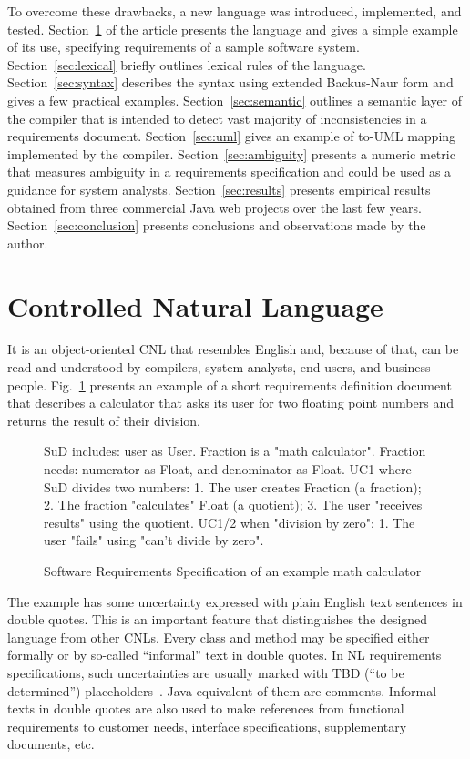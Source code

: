 \documentclass[conference]{IEEEtran}
\newcommand{\code}[1]{\adjustbox{padding=3pt 1pt 3pt 1pt, cframe=gray!50, bgcolor=gray!10}{\texttt{#1}}}
\newcommand{\nospell}[1]{#1}
\begin{document}
To overcome these drawbacks, a new language was introduced,
implemented, and tested. Section~\ref{sec:Requs} of
the article presents the language and gives a simple example of its use,
specifying requirements of a sample software system.
Section~\ref{sec:lexical} briefly outlines lexical rules of the language.
Section~\ref{sec:syntax} describes the syntax using extended \nospell{Backus-Naur}
form and gives a few practical examples. Section~\ref{sec:semantic} outlines
a semantic layer of the compiler that is intended to detect vast majority
of inconsistencies in a requirements document.
Section~\ref{sec:uml} gives an example of to-UML mapping implemented
by the compiler. Section~\ref{sec:ambiguity}
presents a numeric metric that measures ambiguity in a requirements
specification and could be used as a guidance for system analysts.
Section~\ref{sec:results} presents empirical results obtained from three
commercial Java web projects over the last few years.
Section~\ref{sec:conclusion} presents conclusions and observations made by
the author.

\section{Controlled Natural Language}
\label{sec:Requs}

It is an object-oriented CNL that resembles English and, because of that,
can be read and understood by compilers, system analysts, end-users, and
business people. Fig.~\ref{fig:example} presents an example of a short
requirements definition document that describes a calculator that asks its
user for two floating point numbers and returns the result of their
division.

\begin{figure}
\begin{textcode}
SuD includes: user as User.
Fraction is a "math calculator".
Fraction needs:
numerator as Float, and
denominator as Float.
UC1 where SuD divides two numbers:
1. The user creates Fraction (a fraction);
2. The fraction "calculates" Float (a quotient);
3. The user "receives results" using the quotient.
UC1/2 when "division by zero":
1. The user "fails" using "can't divide by zero".
\end{textcode}
\caption{Software Requirements Specification of an example math calculator}
\label{fig:example}
\end{figure}

The example has some uncertainty expressed with plain English text sentences
in double quotes. This is an important feature that distinguishes the designed language from
other CNLs. Every class and method may be specified either formally or
by so-called ``informal'' text in double quotes. In NL requirements
specifications, such uncertainties are usually marked with TBD (``to be
determined'') placeholders~\cite{moynihan00}. Java equivalent of them are
\code{TODO} comments. Informal texts in double quotes are also used to
make references from functional requirements to customer needs, interface
specifications, supplementary documents, etc.
\end{document}

